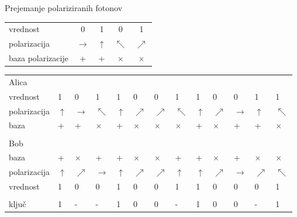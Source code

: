 \documentclass{beamer}
\begin{document}
\begin{frame}{Prejemanje polariziranih fotonov}

\begin{tabular}{l c c c c}
vrednost & 0 & 1 & 0 & 1\\
polarizacija & $\rightarrow$ & $\uparrow$ & $\nwarrow$ & $\nearrow$\\
baza polarizacije & + & + & $\times$ & $\times$\\
\end{tabular}

\bigskip

\begin{tabular}{ l m{0.2 cm} m{0.2 cm} m{0.2 cm} m{0.2 cm} m{0.2 cm} m{0.2 cm} m{0.2 cm} m{0.2 cm} m{0.2 cm} m{0.2 cm} m{0.2 cm} m{0.2 cm}}
Alica\\
vrednost & 1 & 0 & 1 & 1 & 0 & 0 & 1 & 1 & 0 & 0 & 1 & 1 \\
polarizacija & $\uparrow$ & $\rightarrow$ & $\nwarrow$ & $\uparrow$ & $\nearrow$ & $\nearrow$ & $\nwarrow$  & $\uparrow$ & $\nearrow$ & $\rightarrow$ & $\uparrow$ & $\nwarrow$\\
baza & + & + & $\times$ & + & $\times$ & $\times$ & $\times$ & + & $\times$ & + & + & $\times$\\
\\
Bob\\
baza & + & $\times$ & + & + & $\times$ & $\times$ & + & + & $\times$ & + & $\times$ & $\times$\\
polarizacija & $\uparrow$ & $\nearrow$ & $\rightarrow$ & $\uparrow$ & $\nearrow$  & $\nearrow$ & $\uparrow$ & $\uparrow$ & $\nearrow$ & $\rightarrow$ & $\nearrow$ & $\nwarrow$\\
vrednost & 1 & 0 & 0 & 1 & 0 & 0 & 1 & 1 & 0 & 0 & 0 & 1\\
\\
ključ & 1 & - & - & 1 & 0 & 0 & - & 1 & 0 & 0 & - & 1\\
\end{tabular}

\end{frame}

\end{document}
